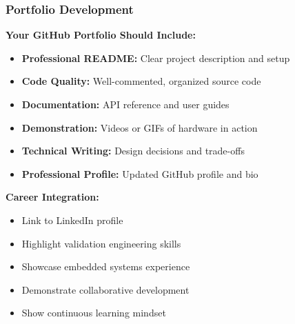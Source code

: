 \documentclass{beamer}
\begin{document}
\begin{frame}
\frametitle{Portfolio Development}
\small \textbf{Your GitHub Portfolio Should Include:}
\begin{itemize}
    \item \footnotesize \textbf{Professional README:} Clear project description and setup
    \item \footnotesize \textbf{Code Quality:} Well-commented, organized source code
    \item \footnotesize \textbf{Documentation:} API reference and user guides
    \item \footnotesize \textbf{Demonstration:} Videos or GIFs of hardware in action
    \item \footnotesize \textbf{Technical Writing:} Design decisions and trade-offs
    \item \footnotesize \textbf{Professional Profile:} Updated GitHub profile and bio
\end{itemize}

\vspace{0.3cm}
\textbf{Career Integration:}
\begin{itemize}
    \item \footnotesize Link to LinkedIn profile
    \item \footnotesize Highlight validation engineering skills
    \item \footnotesize Showcase embedded systems experience
    \item \footnotesize Demonstrate collaborative development
    \item \footnotesize Show continuous learning mindset
\end{itemize}
\end{frame}
\end{document}
